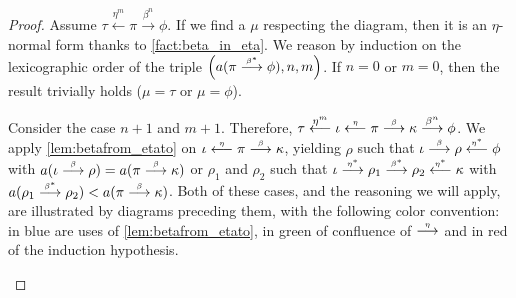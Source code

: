 \documentclass{lmcs}
\newenvironment{myscope}{
\begin{scope}[every node/.style={circle,thick,draw,minimum size=8mm,inner sep=0}, every edge/.style={->,draw=black,thick}, every path/.style={-,draw=black,thick}]
}{
\end{scope}
}
\newenvironment{myscopec}[1]{
\begin{scope}[every node/.style={circle,thick,draw=#1,minimum size=8mm,inner sep=0}, every edge/.style={->,draw=#1,thick}, every path/.style={draw=#1, thick}]
\color{#1}
}{
\end{scope}
}
\newcommand{\edgelabel}[1]{edge node[draw=none, sloped, align=center]{#1 \\}}
\newcommand{\symboltext}[2]{\mathrel{\overset{\makebox[0pt]{\mbox{\normalfont\tiny\sffamily \ensuremath{#1}}}}{#2}}} %
\newcommand{\etato}{\symboltext{\eta}{\longrightarrow}}
\newcommand{\etafrom}{\symboltext{\eta}{\longleftarrow}}
\newcommand{\etatostar}{\symboltext{\eta^*}{\longrightarrow}}
\newcommand{\etafromstar}{\symboltext{\eta^*}{\longleftarrow}}
\newcommand{\betato}{\symboltext{\beta}{\longrightarrow}}
\newcommand{\betatostar}{\symboltext{\beta^*}{\longrightarrow}}
\begin{document}
\begin{proof}
Assume $\tau\overset{\eta^m}{\longleftarrow}\pi\overset{\beta^n}{\longrightarrow}\phi$.
If we find a $\mu$ respecting the diagram, then it is an $\eta$-normal form thanks to \autoref{fact:beta_in_eta}.
We reason by induction on the lexicographic order of the triple $\left(a(\pi\betatostar\phi), n, m\right)$.
If $n=0$ or $m=0$, then the result trivially holds ($\mu = \tau$ or $\mu = \phi$).

Consider the case $n+1$ and $m+1$.
Therefore, $\tau\overset{\eta^m}{\longleftarrow}\iota\etafrom\pi\betato\kappa\overset{\beta^n}{\longrightarrow}\phi$.
We apply \autoref{lem:betafrom_etato} on $\iota\etafrom\pi\betato\kappa$, yielding $\rho$ such that $\iota\betato\rho\etafromstar\phi$ with $a(\iota\betato\rho)=a(\pi\betato\kappa)$ or $\rho_1$ and $\rho_2$ such that $\iota\etatostar\rho_1\betatostar\rho_2\etafromstar\kappa$ with $a(\rho_1\betatostar\rho_2) < a(\pi\betato\kappa)$.
Both of these cases, and the reasoning we will apply, are illustrated by diagrams preceding them, with the following color convention: in blue are uses of \autoref{lem:betafrom_etato}, in green of confluence of $\etato$ and in red of the induction hypothesis.

\begin{center}
\end{center}
\end{proof}
\end{document}
